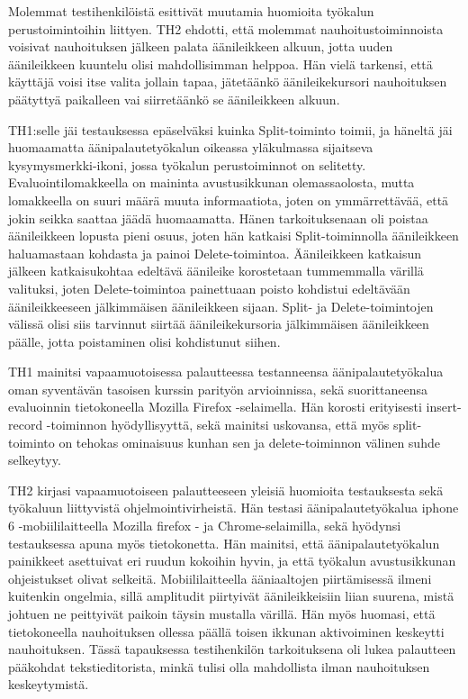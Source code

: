 \documentclass[utf8]{gradu3}
\begin{document}
Molemmat testihenkilöistä esittivät muutamia huomioita työkalun perustoimintoihin liittyen. TH2 ehdotti, että molemmat nauhoitustoiminnoista voisivat nauhoituksen jälkeen palata äänileikkeen alkuun, jotta uuden äänileikkeen kuuntelu olisi mahdollisimman helppoa. Hän vielä tarkensi, että käyttäjä voisi itse valita jollain tapaa, jätetäänkö äänileikekursori nauhoituksen päätyttyä paikalleen vai siirretäänkö se äänileikkeen alkuun.

TH1:selle jäi testauksessa epäselväksi kuinka Split-toiminto toimii, ja häneltä jäi huomaamatta äänipalautetyökalun oikeassa yläkulmassa sijaitseva kysymysmerkki-ikoni, jossa työkalun perustoiminnot on selitetty. Evaluointilomakkeella on maininta avustusikkunan olemassaolosta, mutta lomakkeella on suuri määrä muuta informaatiota, joten on ymmärrettävää, että jokin seikka saattaa jäädä huomaamatta. Hänen tarkoituksenaan oli poistaa äänileikkeen lopusta pieni osuus, joten hän katkaisi Split-toiminnolla äänileikkeen haluamastaan kohdasta ja painoi Delete-toimintoa. Äänileikkeen katkaisun jälkeen katkaisukohtaa edeltävä äänileike korostetaan tummemmalla värillä valituksi, joten Delete-toimintoa painettuaan poisto kohdistui edeltävään äänileikkeeseen jälkimmäisen äänileikkeen sijaan. Split- ja Delete-toimintojen välissä olisi siis tarvinnut siirtää äänileikekursoria jälkimmäisen äänileikkeen päälle, jotta poistaminen olisi kohdistunut siihen.

TH1 mainitsi vapaamuotoisessa palautteessa testanneensa äänipalautetyökalua oman syventävän tasoisen kurssin parityön arvioinnissa, sekä suorittaneensa evaluoinnin tietokoneella Mozilla Firefox -selaimella. Hän korosti erityisesti insert-record -toiminnon hyödyllisyyttä, sekä mainitsi uskovansa, että myös split-toiminto on tehokas ominaisuus kunhan sen ja delete-toiminnon välinen suhde selkeytyy. 

TH2 kirjasi vapaamuotoiseen palautteeseen yleisiä huomioita testauksesta sekä työkaluun liittyvistä ohjelmointivirheistä. Hän testasi äänipalautetyökalua iphone 6 -mobiililaitteella Mozilla firefox - ja Chrome-selaimilla, sekä hyödynsi testauksessa apuna myös tietokonetta. Hän mainitsi, että äänipalautetyökalun painikkeet asettuivat eri ruudun kokoihin hyvin, ja että työkalun avustusikkunan ohjeistukset olivat selkeitä. Mobiililaitteella ääniaaltojen piirtämisessä ilmeni kuitenkin ongelmia, sillä amplitudit piirtyivät äänileikkeisiin liian suurena, mistä johtuen ne peittyivät paikoin täysin mustalla värillä. Hän myös huomasi, että tietokoneella nauhoituksen ollessa päällä toisen ikkunan aktivoiminen keskeytti nauhoituksen. Tässä tapauksessa testihenkilön tarkoituksena oli lukea palautteen pääkohdat tekstieditorista, minkä tulisi olla mahdollista ilman nauhoituksen keskeytymistä.
\end{document}
